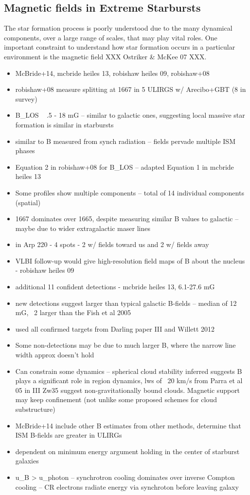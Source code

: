 \subsection{Magnetic fields in Extreme Starbursts}
\label{sub:oh_zeeman}

The star formation process is poorly understood due to the many dynamical components, over a large range of scales, that may play vital roles. One important constraint to understand how star formation occurs in a particular environment is the magnetic field XXX Ostriker \& McKee 07 XXX. 

\begin{itemize}
\item McBride+14, mcbride heiles 13, robishaw heiles 09, robishaw+08
\item robishaw+08 measure splitting at 1667 in 5 ULIRGS w/ Arecibo+GBT (8 in survey)
\item B_LOS ~ .5 - 18 mG -- similar to galactic ones, suggesting local massive star formation is similar in starbursts
\item similar to B measured from synch radiation -- fields pervade multiple ISM phases
\item Equation 2 in robishaw+08 for B_LOS -- adapted Equation 1 in mcbride heiles 13
\item Some profiles show multiple components -- total of 14 individual components (spatial)
\item 1667 dominates over 1665, despite measuring similar B values to galactic -- maybe due to wider extragalactic maser lines
\item in Arp 220 - 4 spots - 2 w/ fields toward us and 2 w/ fields away
\item VLBI follow-up would give high-resolution field maps of B about the nucleus - robishaw heiles 09
\item additional 11 confident detections - mcbride heiles 13, 6.1-27.6 mG
\item new detections suggest larger than typical galactic B-fields -- median of 12 mG, ~2 larger than the Fish et al 2005
\item used all confirmed targets from Darling paper III and Willett 2012
\item Some non-detections may be due to much larger B, where the narrow line width approx doesn't hold
\item Can constrain some dynamics -- spherical cloud stability inferred suggests B plays a significant role in region dynamics, lws of ~20 km/s from Parra et al 05 in III Zw35 suggest non-gravitationally bound clouds. Magnetic support may keep confinement (not unlike some proposed schemes for cloud substructure)
\item McBride+14 include other B estimates from other methods, determine that ISM B-fields are greater in ULIRGs
\item dependent on minimum energy argument holding in the center of starburst galaxies
\item u_B > u_photon -- synchrotron cooling dominates over inverse Compton cooling -- CR electrons radiate energy via synchroton before leaving galaxy
\end{itemize}
